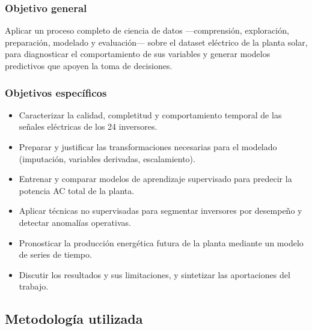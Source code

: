 \subsubsection*{Objetivo general}

Aplicar un proceso completo de ciencia de datos —comprensión, exploración, preparación, modelado y evaluación— sobre el dataset eléctrico de la planta solar, para diagnosticar el comportamiento de sus variables y generar modelos predictivos que apoyen la toma de decisiones.

\subsubsection*{Objetivos específicos}

\begin{itemize}
    \item Caracterizar la calidad, completitud y comportamiento temporal de las señales eléctricas de los 24 inversores.
    \item Preparar y justificar las transformaciones necesarias para el modelado (imputación, variables derivadas, escalamiento).
    \item Entrenar y comparar modelos de aprendizaje supervisado para predecir la potencia AC total de la planta.
    \item Aplicar técnicas no supervisadas para segmentar inversores por desempeño y detectar anomalías operativas.
    \item Pronosticar la producción energética futura de la planta mediante un modelo de series de tiempo.
    \item Discutir los resultados y sus limitaciones, y sintetizar las aportaciones del trabajo.
\end{itemize}

\subsection*{Metodología utilizada}

